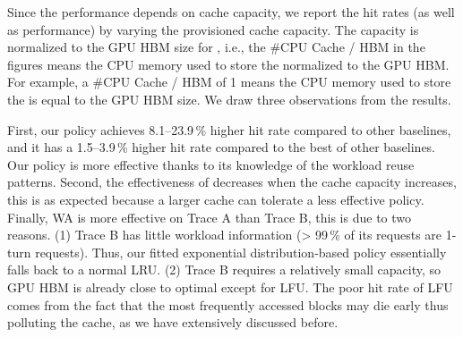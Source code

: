 Since the performance depends on cache capacity,
we report the hit rates (as well as performance) by varying the provisioned {\kvcache} cache capacity.
The capacity is normalized to the GPU HBM size for {\kvcache},
i.e., the \#CPU Cache / HBM in the figures means
 the CPU memory used to store the {\kvcache} normalized to the GPU HBM.
 For example, a \#CPU Cache / HBM of 1 means the CPU memory used to store the {\kvcache}
 is equal to the GPU HBM size.
We draw three observations from the results.

First, our policy {\policy} achieves 8.1--23.9\,\% higher hit rate compared to other baselines,
and it has a 1.5--3.9\,\% higher hit rate compared to the best of other baselines.
Our policy is more effective thanks to its knowledge of the workload reuse patterns.
Second, the effectiveness of {\policy} decreases when the cache capacity increases,
this is as expected because a larger cache can tolerate a less effective policy.
Finally, WA is more effective on Trace A than Trace B, this is due to two reasons. 
(1) Trace B has little workload information (> 99\,\% of its requests are 1-turn requests).
Thus, our fitted exponential distribution-based policy essentially falls back
to a normal LRU. (2) Trace B requires a relatively small {\kvcache} capacity,
so GPU HBM is already close to optimal except for LFU.
The poor hit rate of LFU comes from the fact that the most frequently accessed blocks may die early
thus polluting the {\kvcache} cache, as we have extensively discussed before.

